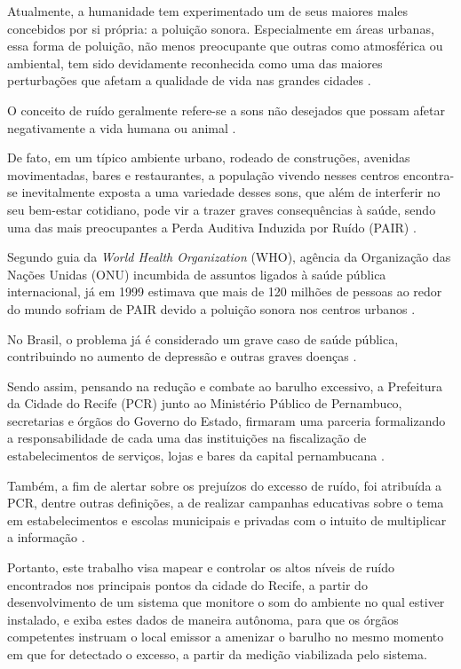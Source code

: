 \documentclass[
    12pt,               %
    openright,          %
    oneside,
    a4paper,            
    english,            %
    brazil              %
    ]{abntex2}
\begin{document}
Atualmente, a humanidade tem experimentado um de seus maiores males concebidos por si própria: a poluição sonora. Especialmente em áreas urbanas, essa forma de poluição, não menos preocupante que outras como atmosférica ou ambiental, tem sido devidamente reconhecida como uma das maiores perturbações que afetam a qualidade de vida nas grandes cidades \cite{majid}. 

O conceito de ruído geralmente refere-se a sons não desejados que possam afetar negativamente a vida humana ou animal \cite{enda}. 

De fato, em um típico ambiente urbano, rodeado de construções, avenidas movimentadas, bares e restaurantes, a população vivendo nesses centros encontra-se inevitalmente exposta a uma variedade desses sons, que além de interferir no seu bem-estar cotidiano, pode vir a trazer graves consequências à saúde, sendo uma das mais preocupantes a Perda Auditiva Induzida por Ruído (PAIR) \cite{tizi}. 

Segundo guia da \textit{World Health Organization} (WHO), agência da Organização das Nações Unidas (ONU) incumbida de assuntos ligados à saúde pública internacional, já em 1999 estimava que mais de 120 milhões de pessoas ao redor do mundo sofriam de PAIR devido a poluição sonora nos centros urbanos \cite{thomas}. 

No Brasil, o problema já é considerado um grave caso de saúde pública, contribuindo no aumento de depressão e outras graves doenças \cite{andre}. 

Sendo assim, pensando na redução e combate ao barulho excessivo, a Prefeitura da Cidade do Recife (PCR) junto ao Ministério Público de Pernambuco, secretarias e órgãos do Governo do Estado, firmaram uma parceria formalizando a responsabilidade de cada uma das instituições na fiscalização de estabelecimentos de serviços, lojas e bares da capital pernambucana \cite{secretaria}. 

Também, a fim de alertar sobre os prejuízos do excesso de ruído, foi atribuída a PCR, dentre outras definições, a de realizar campanhas educativas sobre o tema em estabelecimentos e escolas municipais e privadas com o intuito de multiplicar a informação \cite{secretaria}. 

Portanto, este trabalho visa mapear e controlar os altos níveis de ruído encontrados nos principais pontos da cidade do Recife, a partir do desenvolvimento de um sistema que monitore o som do ambiente no qual estiver instalado, e exiba estes dados de maneira autônoma, para que os órgãos competentes instruam o local emissor a amenizar o barulho no mesmo momento em que for detectado o excesso, a partir da medição viabilizada pelo sistema.
\end{document}
